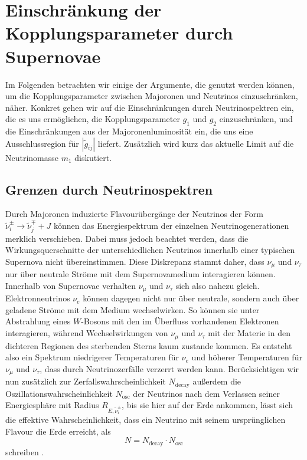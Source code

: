 
\chapter{Einschränkung der Kopplungsparameter durch Supernovae}

Im Folgenden betrachten wir einige der Argumente, die genutzt werden können, um die Kopplungsparameter zwischen Majoronen und Neutrinos einzuschränken, näher.
Konkret gehen wir auf die Einschränkungen durch Neutrinospektren ein, die es uns ermöglichen, die Kopplungsparameter $g_1$ und $g_2$ einzuschränken, und die Einschränkungen aus der Majoronenluminosität ein,
die uns eine Ausschlussregion für $|\tilde{g}_{i j}|$ liefert.
Zusätzlich wird kurz das aktuelle Limit auf die Neutrinomasse $m_1$ diskutiert.

\section{Grenzen durch Neutrinospektren}
\label{subsec:spektrengrenzen}

Durch Majoronen induzierte Flavourübergänge der Neutrinos der Form $\tilde{\nu}^\pm_i \rightarrow \tilde{\nu}^\mp_j + J$ können das Energiespektrum der einzelnen Neutrinogenerationen merklich verschieben. 
Dabei muss jedoch beachtet werden, dass die Wirkungsquerschnitte der unterschiedlichen Neutrinos innerhalb einer typischen Supernova nicht übereinstimmen.
Diese Diskrepanz stammt daher, dass $\nu_\mu$ und $\nu_\tau$ nur über neutrale Ströme mit dem Supernovamedium interagieren können.
Innerhalb von Supernovae verhalten $\nu_\mu$ und $\nu_\tau$ sich also nahezu gleich.
Elektronneutrinos $\nu_e$ können dagegen nicht nur über neutrale, sondern auch über geladene Ströme mit dem Medium wechselwirken.
So können sie unter Abstrahlung eines $W$-Bosons mit den im Überfluss vorhandenen Elektronen interagieren, während Wechselwirkungen von $\nu_\mu$ und $\nu_\tau$ mit der Materie in den dichteren Regionen des sterbenden Sterns kaum zustande kommen.
Es entsteht also ein Spektrum niedrigerer Temperaturen für $\nu_e$ und höherer Temperaturen für $\nu_\mu$ und $\nu_\tau$, dass durch Neutrinozerfälle verzerrt werden kann.
Berücksichtigen wir nun zusätzlich zur Zerfallswahrscheinlichkeit $N_\text{decay}$ außerdem die Oszillationswahrscheinlichkeit $N_\text{osc}$ der Neutrinos nach dem Verlassen seiner Energiesphäre mit Radius $R_{E, \tilde{\nu}^\pm_i}$, 
bis sie hier auf der Erde ankommen, lässt sich die effektive Wahrscheinlichkeit, dass ein Neutrino mit seinem ursprünglichen Flavour die Erde erreicht, als
\begin{equation}
    N = N_\text{decay} \cdot N_\text{osc}
    \label{eq:survivalprob}
\end{equation}
schreiben \cite{supernovaboundsdasandere}.

